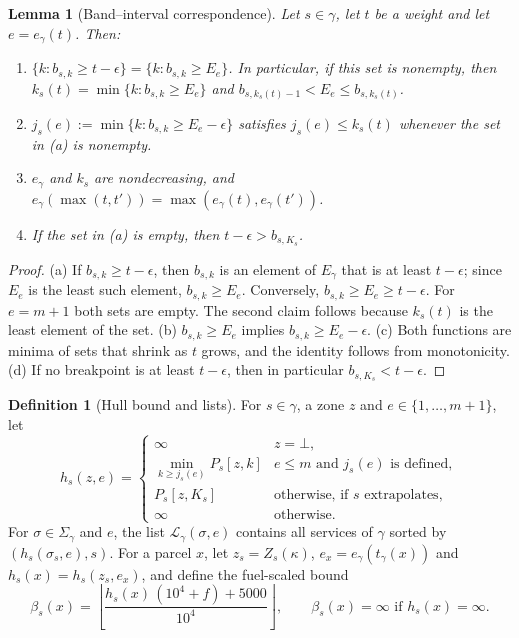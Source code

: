 \documentclass[11pt]{article}
\newtheorem{lemma}[theorem]{Lemma}
\theoremstyle{definition}
\newtheorem{definition}[theorem]{Definition}
\theoremstyle{remark}
\newcommand{\fl}[1]{\left\lfloor #1 \right\rfloor}
\begin{document}
\begin{lemma}[Band--interval correspondence]\label{lem:band}
Let $s\in\gamma$, let $t$ be a weight and let $e=e_\gamma(t)$. Then:
\begin{enumerate}[label=(\alph*)]
\item $\{k:b_{s,k}\ge t-\epsilon\}=\{k:b_{s,k}\ge E_e\}$. In particular, if this set is nonempty,
then $k_s(t)=\min\{k:b_{s,k}\ge E_e\}$ and $b_{s,k_s(t)-1}<E_e\le b_{s,k_s(t)}$.
\item $j_s(e):=\min\{k:b_{s,k}\ge E_e-\epsilon\}$ satisfies $j_s(e)\le k_s(t)$ whenever the set in
(a) is nonempty.
\item $e_\gamma$ and $k_s$ are nondecreasing, and $e_\gamma(\max(t,t'))=\max(e_\gamma(t),e_\gamma(t'))$.
\item If the set in (a) is empty, then $t-\epsilon>b_{s,K_s}$.
\end{enumerate}
\end{lemma}
\begin{proof}
(a) If $b_{s,k}\ge t-\epsilon$, then $b_{s,k}$ is an element of $E_\gamma$ that is at least
$t-\epsilon$; since $E_e$ is the least such element, $b_{s,k}\ge E_e$. Conversely,
$b_{s,k}\ge E_e\ge t-\epsilon$. For $e=m+1$ both sets are empty. The second claim follows
because $k_s(t)$ is the least element of the set.
(b) $b_{s,k}\ge E_e$ implies $b_{s,k}\ge E_e-\epsilon$.
(c) Both functions are minima of sets that shrink as $t$ grows, and the identity follows
from monotonicity.
(d) If no breakpoint is at least $t-\epsilon$, then in particular $b_{s,K_s}<t-\epsilon$.
\end{proof}

\begin{definition}[Hull bound and lists]\label{def:hull}
For $s\in\gamma$, a zone $z$ and $e\in\{1,\dots,m+1\}$, let
\[
h_s(z,e)=\begin{cases}
\infty & z=\bot,\\
\min_{k\ge j_s(e)}P_s[z,k] & e\le m \text{ and } j_s(e) \text{ is defined},\\
P_s[z,K_s] & \text{otherwise, if $s$ extrapolates},\\
\infty & \text{otherwise}.
\end{cases}
\]
For $\sigma\in\Sigma_\gamma$ and $e$, the list $\mathcal L_\gamma(\sigma,e)$ contains all services of
$\gamma$ sorted by $(h_s(\sigma_s,e),s)$. For a parcel $x$, let
$z_s=Z_s(\kappa)$, $e_x=e_\gamma(t_\gamma(x))$ and $h_s(x)=h_s(z_s,e_x)$, and define the
fuel-scaled bound
\[
\beta_s(x)=\fl{\frac{h_s(x)\,(10^4+f)+5000}{10^4}},\qquad \beta_s(x)=\infty\text{ if }h_s(x)=\infty.
\]
\end{definition}
\end{document}
